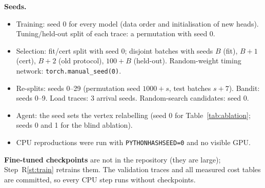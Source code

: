 \textbf{Seeds.}
\begin{itemize}
  \item Training: seed 0 for every model (data order and initialisation of new heads). Tuning/held-out split of each
  trace: a permutation with seed 0.
  \item Selection: fit/cert split with seed 0; disjoint batches with seeds $B$ (fit), $B+1$ (cert), $B+2$ (old
  protocol), $100+B$ (held-out). Random-weight timing network: \texttt{torch.manual\_seed(0)}.
  \item Re-splits: seeds 0--29 (permutation seed $1000+s$, test batches $s+7$). Bandit: seeds 0--9. Load traces: 3
  arrival seeds. Random-search candidates: seed 0.
  \item Agent: the seed sets the vertex relabelling (seed 0 for Table~\ref{tab:ablation}; seeds 0 and 1 for the blind
  ablation).
  \item CPU reproductions were run with \texttt{PYTHONHASHSEED=0} and no visible GPU.
\end{itemize}

\textbf{Fine-tuned checkpoints} are not in the repository (they are large); Step~R\ref{st:train} retrains them. The
validation traces and all measured cost tables are committed, so every CPU step runs without checkpoints.

